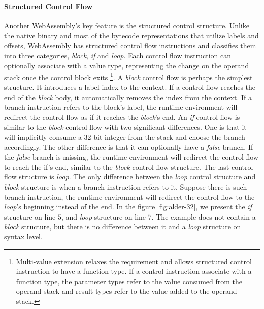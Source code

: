 \paragraph{Structured Control Flow}
Another WebAssembly's key feature is the structured control structure. Unlike
the native binary and most of the bytecode representations that utilize labels
and offsets, WebAssembly has structured control flow instructions and classifies
them into three categories, \emph{block}, \emph{if} and \emph{loop}. Each
control flow instruction can optionally associate with a value type,
representing the change on the operand stack once the control block exits
\footnote{Multi-value extension relaxes the requirement and allows structured
control instruction to have a function type. If a control instruction associate
with a function type, the parameter types refer to the value consumed from the
operand stack and result types refer to the value added to the operand stack.}.
A \emph{block} control flow is perhaps the simplest structure. It introduces a
label index to the context. If a control flow reaches the end of the
\emph{block} body, it automatically removes the index from the context.
If a branch instruction refers to the block's label, the runtime environment
will redirect the control flow as if it reaches the \emph{block}'s end. An
\emph{if} control flow is similar to the \emph{block} control flow with two
significant differences. One is that it will implicitly consume a 32-bit integer
from the stack and choose the branch accordingly. The other difference is that
it can optionally have a \emph{false} branch. If the \emph{false} branch is
missing, the runtime environment will redirect the control flow to reach the
{if}'s end, similar to the \emph{block} control flow structure. The last control
flow structure is \emph{loop}. The only difference between the \emph{loop}
control structure and \emph{block} structure is when a branch instruction refers
to it. Suppose there is such branch instruction, the runtime environment will
redirect the control flow to the \emph{loop}'s beginning instead of the end. In
the figure \ref{fig:alder-32}, we present the \emph{if} structure on line $5$,
and \emph{loop} structure on line $7$. The example does not contain a
\emph{block} structure, but there is no difference between it and a \emph{loop}
structure on syntax level.

